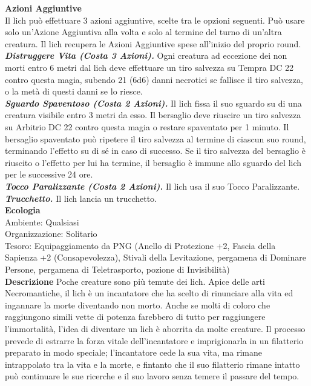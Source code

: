 \begin{multicols}{2}
\textbf{Azioni Aggiuntive}\\

Il lich può effettuare 3 azioni aggiuntive, scelte tra le opzioni seguenti. Può usare solo un'Azione Aggiuntiva alla volta e solo al termine del turno di un'altra creatura. Il lich recupera le Azioni Aggiuntive spese all'inizio del proprio round.\\

\emph{\textbf{Distruggere Vita (Costa 3 Azioni).}} Ogni creatura ad eccezione dei non morti entro 6 metri dal lich deve effettuare un tiro salvezza su Tempra DC  22 contro questa magia, subendo 21 (6d6) danni necrotici se fallisce il tiro salvezza, o la metà di questi danni se lo riesce.\\

\emph{\textbf{Sguardo Spaventoso (Costa 2 Azioni).}} Il lich fissa il suo sguardo su di una creatura visibile entro 3 metri da esso. Il bersaglio deve riuscire un tiro salvezza su Arbitrio DC  22 contro questa magia o restare spaventato per 1 minuto. Il bersaglio spaventato può ripetere il tiro salvezza al termine di ciascun suo round, terminando l'effetto su di sé in caso di successo. Se il tiro salvezza del bersaglio è riuscito o l'effetto per lui ha termine, il bersaglio è immune allo sguardo del lich per le successive 24 ore.\\

\emph{\textbf{Tocco Paralizzante (Costa 2 Azioni).}} Il lich usa il suo Tocco Paralizzante.\\

\emph{\textbf{Trucchetto.}} Il lich lancia un trucchetto.\\

\textbf{Ecologia}\\
Ambiente: Qualsiasi\\
Organizzazione: Solitario\\
Tesoro: Equipaggiamento da PNG (Anello di Protezione +2, Fascia della Sapienza +2 (Consapevolezza), Stivali della Levitazione, pergamena di Dominare Persone, pergamena di Teletrasporto, pozione di Invisibilità)\\

\textbf{Descrizione}
Poche creature sono più temute dei lich. Apice delle arti Necromantiche, il lich è un incantatore che ha scelto di rinunciare alla vita ed ingannare la morte diventando non morto. Anche se molti di coloro che raggiungono simili vette di potenza farebbero di tutto per raggiungere l’immortalità, l’idea di diventare un lich è aborrita da molte creature. Il processo prevede di estrarre la forza vitale dell’incantatore e imprigionarla in un filatterio preparato in modo speciale; l’incantatore cede la sua vita, ma rimane intrappolato tra la vita e la morte, e fintanto che il suo filatterio rimane intatto può continuare le sue ricerche e il suo lavoro senza temere il passare del tempo.\\



\end{multicols}
